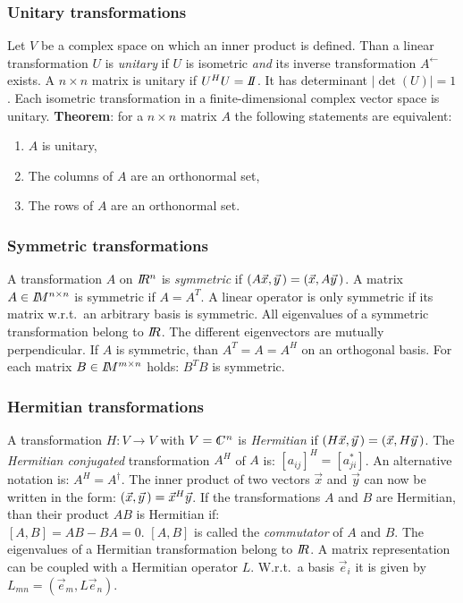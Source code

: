 \documentclass[twoside]{report}
\begin{document}
\subsubsection{Unitary transformations}
Let $V$ be a complex space on which an inner product is defined. Than a linear
transformation $U$ is {\it unitary} if $U$ is isometric {\it and} its inverse
transformation $A^\leftarrow$ exists. A $n\times n$ matrix is unitary if
$U^HU=I\hspace{-1mm}I$. It has determinant $|\det(U)|=1$. Each isometric transformation
in a finite-dimensional complex vector space is unitary.
\npar
{\bf Theorem}: for a $n\times n$ matrix $A$ the following statements are
equivalent:
\begin{enumerate}
\item $A$ is unitary,
\item The columns of $A$ are an orthonormal set,
\item The rows of $A$ are an orthonormal set.
\end{enumerate}

\subsubsection{Symmetric transformations}
A transformation $A$ on $I\hspace{-1mm}R^n$ is {\it symmetric} if
$(A\vec{x},\vec{y}\,)=(\vec{x},A\vec{y}\,)$. A matrix $A\in I\hspace{-1mm}M^{n\times n}$
is symmetric if $A=A^T$. A linear operator is only symmetric if its matrix
w.r.t.\ an arbitrary basis is symmetric. All eigenvalues of a symmetric
transformation belong to $I\hspace{-1mm}R$. The different eigenvectors are mutually
perpendicular. If $A$ is symmetric, than $A^T=A=A^H$ on an orthogonal basis.
\npar
For each matrix $B\in I\hspace{-1mm}M^{m\times n}$ holds: $B^TB$ is symmetric.

\subsubsection{Hermitian transformations}
A transformation $H:V\rightarrow V$ with $V=\CC^n$ is {\it Hermitian} if
$(H\vec{x},\vec{y}\,)=(\vec{x},H\vec{y}\,)$. The {\it Hermitian conjugated}
transformation $A^H$ of $A$ is: $[a_{ij}]^H=[a_{ji}^*]$. An alternative
notation is: $A^H=A^\dagger$. The inner product of two vectors $\vec{x}$ and
$\vec{y}$ can now be written in the form: $(\vec{x},\vec{y}\,)=\vec{x}^H\vec{y}$.
\npar
If the transformations $A$ and $B$ are Hermitian, than their product $AB$ is
Hermitian if:\\ $[A,B]=AB-BA=0$. $[A,B]$ is called the {\it commutator} of $A$
and $B$.
\npar
The eigenvalues of a Hermitian transformation belong to $I\hspace{-1mm}R$.
\npar
A matrix representation can be coupled with a Hermitian operator $L$.
W.r.t.\ a basis $\vec{e}_i$ it is given by $L_{mn}=(\vec{e}_m,L\vec{e}_n)$.
\end{document}

